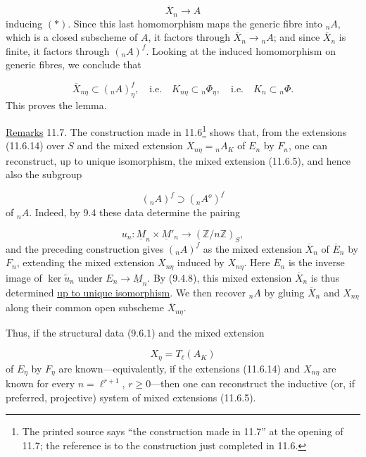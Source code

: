 \begin{equation}\tag{***}
\overline X_n\longrightarrow A
\end{equation}
inducing $(*)$. Since this last homomorphism maps the generic fibre into
${}_nA$, which is a closed subscheme of $A$, it factors through
$\overline X_n\to{}_nA$; and since $\overline X_n$ is finite, it factors
through $({}_nA)^f$. Looking at the induced homomorphism on generic
fibres, we conclude that

\begin{equation*}
\overline X_{n\eta}\subset({}_nA)^f_\eta,
\quad\text{i.e.}\quad
K_{n\eta}\subset{}_n\Phi_\eta,
\quad\text{i.e.}\quad
K_n\subset{}_n\Phi.
\end{equation*}
This proves the lemma.

\medskip
\noindent
\underline{Remarks} 11.7. The construction made in 11.6\footnote{The
printed source says ``the construction made in 11.7'' at the opening of
11.7; the reference is to the construction just completed in 11.6.}
shows that, from the extensions (11.6.14) over $S$ and the mixed
extension $X_{n\eta}={}_nA_K$ of $E_n$ by $F_n$, one can reconstruct,
up to unique isomorphism, the mixed extension (11.6.5), and hence also
the subgroup

\begin{equation*}
({}_nA)^f\supset({}_nA^o)^f
\end{equation*}
of ${}_nA$. Indeed, by 9.4 these data determine the pairing

\begin{equation*}
u_n:\underline M_n\times\underline M'_n
 \longrightarrow(\mathbb Z/n\mathbb Z)_S,
\end{equation*}
and the preceding construction gives $({}_nA)^f$ as the mixed extension
$\overline X_n$ of $\overline E_n$ by $F_n$, extending the mixed
extension $\overline X_{n\eta}$ induced by $X_{n\eta}$. Here
$\overline E_n$ is the inverse image of $\ker\widetilde u_n$ under
$E_n\to\underline M_n$. By (9.4.8), this mixed extension
$\overline X_n$ is thus determined \underline{up to unique
isomorphism}. We then recover ${}_nA$ by gluing $\overline X_n$ and
$X_{n\eta}$ along their common open subscheme $\overline X_{n\eta}$.

Thus, if the structural data (9.6.1) and the mixed extension

\begin{equation*}
X_\eta=T_\ell(A_K)
\end{equation*}
of $E_\eta$ by $F_\eta$ are known---equivalently, if the extensions
(11.6.14) and $X_{n\eta}$ are known for every $n=\ell^{r+1}$,
$r\geq0$---then one can reconstruct the inductive (or, if preferred,
projective) system of mixed extensions (11.6.5).
